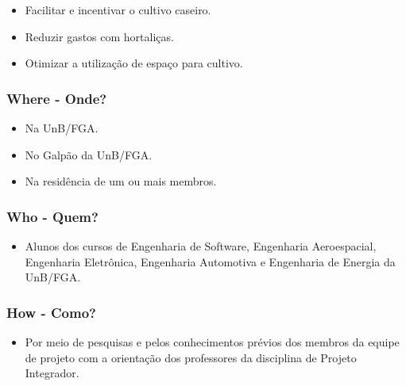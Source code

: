 	 	\begin{itemize}
	 		
	  		\item Facilitar e incentivar o cultivo caseiro.
	  		
	  		\item Reduzir gastos com hortaliças.
	  		
	  		\item Otimizar a utilização de espaço para cultivo.
	  		
	  	\end{itemize}
  	
  	\subsubsection{Where - Onde?}
  	
  	\begin{itemize}
  		
  		\item Na UnB/FGA.
  		
  		\item No Galpão da UnB/FGA.
  		
  		\item Na residência de um ou mais membros.
  		
  	\end{itemize}
  
	\subsubsection{Who - Quem?}
	
	\begin{itemize}
		
		\item Alunos dos cursos de Engenharia de Software, Engenharia Aeroespacial, Engenharia Eletrônica, Engenharia Automotiva e Engenharia de Energia da UnB/FGA.
		
	\end{itemize}

	\subsubsection{How - Como?}
	
	\begin{itemize}
		
		\item Por meio de pesquisas e pelos conhecimentos prévios dos membros da equipe de projeto com a orientação dos professores da disciplina de Projeto Integrador.
		
	\end{itemize}

